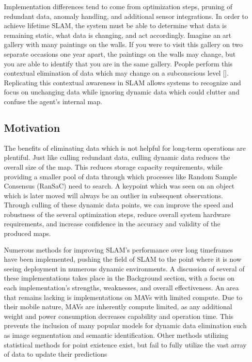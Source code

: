 \documentclass[12pt]{article}
\begin{document}
Implementation differences tend to come from optimization steps, pruning of redundant data, anomaly handling, and additional sensor integrations. In order to achieve lifetime SLAM, the system must be able to determine what data is remaining static, what data is changing, and act accordingly. Imagine an art gallery with many paintings on the walls. If you were to visit this gallery on two separate occasions one year apart, the paintings on the walls may change, but you are able to identify that you are in the same gallery. People perform this contextual elimination of data which may change on a subconscious level []. Replicating this contextual awareness in SLAM allows systems to recognize and focus on unchanging data while ignoring dynamic data which could clutter and confuse the agent's internal map.

\subsection{Motivation}

The benefits of eliminating data which is not helpful for long-term operations are plentiful. Just like culling redundant data, culling dynamic data reduces the overall size of the map. This reduces storage capacity requirements, while providing a smaller pool of data through which processes like Random Sample Consensus (RanSaC) need to search. A keypoint which was seen on an object which is later moved will always be an outlier in subsequent observations. Through culling of these dynamic data points, we can improve the speed and robustness of the several optimization steps, reduce overall system hardware requirements, and increase confidence in the accuracy and validity of the produced maps.

Numerous methods for improving SLAM's performance over long timeframes have been implemented, pushing the field of SLAM to the point where it is now seeing deployment in numerous dynamic environments. A discussion of several of these implementations takes place in the Background section, with a focus on each implementation's strengths, weaknesses, and overall effectiveness. An area that remains lacking is implementations on MAVs with limited compute. Due to their mobile nature, MAVs are inherently compute limited, as any additional weight and power consumption decreases capability and operation time. This prevents the inclusion of many popular models for dynamic data elimination such as image segmentation and semantic identification. Other methods utilizing statistical methods for point existence exist, but fail to fully utilize the vast array of data to update their predictions
\end{document}

